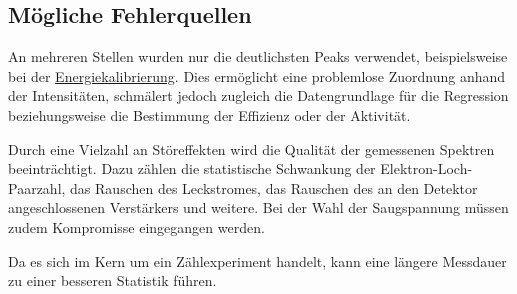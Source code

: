\subsection{Mögliche Fehlerquellen}
An mehreren Stellen wurden nur die deutlichsten Peaks verwendet,
beispielsweise bei der \hyperref[sec:auswertung:energiekalibrierung]{Energiekalibrierung}.
Dies ermöglicht eine problemlose Zuordnung anhand der Intensitäten,
schmälert jedoch zugleich die Datengrundlage für die Regression beziehungsweise die Bestimmung der Effizienz oder der Aktivität.

Durch eine Vielzahl an Störeffekten wird die Qualität der gemessenen Spektren beeinträchtigt.
Dazu zählen
    die statistische Schwankung der Elektron-Loch-Paarzahl,
    das Rauschen des Leckstromes,
    das Rauschen des an den Detektor angeschlossenen Verstärkers
    und weitere.
Bei der Wahl der Saugspannung müssen zudem Kompromisse eingegangen werden.

Da es sich im Kern um ein Zählexperiment handelt,
kann eine längere Messdauer zu einer besseren Statistik führen.


